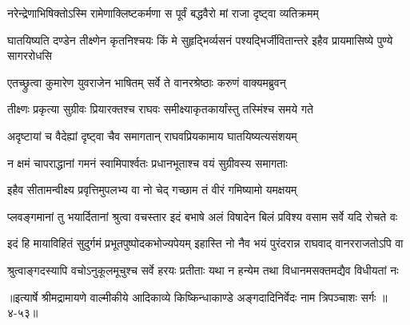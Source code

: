 \twolineshloka
{नरेन्द्रेणाभिषिक्तोऽस्मि रामेणाक्लिष्टकर्मणा}
{स पूर्वं बद्धवैरो मां राजा दृष्ट्वा व्यतिक्रमम्} %

\threelineshloka
{घातयिष्यति दण्डेन तीक्ष्णेन कृतनिश्चयः}
{किं मे सुहृद्भिर्व्यसनं पश्यद्भिर्जीवितान्तरे}
{इहैव प्रायमासिष्ये पुण्ये सागररोधसि} %

\twolineshloka
{एतच्छ्रुत्वा कुमारेण युवराजेन भाषितम्}
{सर्वे ते वानरश्रेष्ठाः करुणं वाक्यमब्रुवन्} %

\twolineshloka
{तीक्ष्णः प्रकृत्या सुग्रीवः प्रियारक्तश्च राघवः}
{समीक्ष्याकृतकार्यांस्तु तस्मिंश्च समये गते} %

\twolineshloka
{अदृष्टायां च वैदेह्यां दृष्ट्वा चैव समागतान्}
{राघवप्रियकामाय घातयिष्यत्यसंशयम्} %

\twolineshloka
{न क्षमं चापराद्धानां गमनं स्वामिपार्श्वतः}
{प्रधानभूताश्च वयं सुग्रीवस्य समागताः} %

\twolineshloka
{इहैव सीतामन्वीक्ष्य प्रवृत्तिमुपलभ्य वा}
{नो चेद् गच्छाम तं वीरं गमिष्यामो यमक्षयम्} %

\twolineshloka
{प्लवङ्गमानां तु भयार्दितानां श्रुत्वा वचस्तार इदं बभाषे}
{अलं विषादेन बिलं प्रविश्य वसाम सर्वे यदि रोचते वः} %

\twolineshloka
{इदं हि मायाविहितं सुदुर्गमं प्रभूतपुष्पोदकभोज्यपेयम्}
{इहास्ति नो नैव भयं पुरंदरान्न राघवाद् वानरराजतोऽपि वा} %

\twolineshloka
{श्रुत्वाङ्गदस्यापि वचोऽनुकूलमूचुश्च सर्वे हरयः प्रतीताः}
{यथा न हन्येम तथा विधानमसक्तमद्यैव विधीयतां नः} %


॥इत्यार्षे श्रीमद्रामायणे वाल्मीकीये आदिकाव्ये किष्किन्धाकाण्डे अङ्गदादिनिर्वेदः नाम त्रिपञ्चाशः सर्गः ॥४-५३॥
